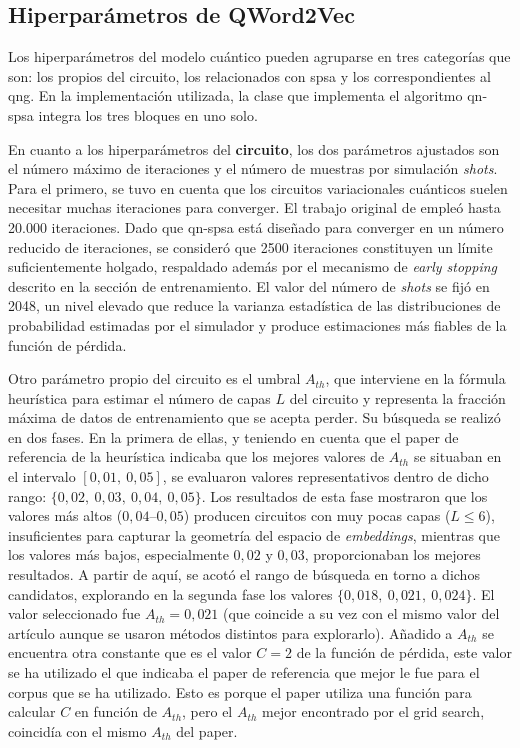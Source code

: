 \subsection{Hiperparámetros de QWord2Vec}

Los hiperparámetros del modelo cuántico pueden agruparse en tres categorías que son: los propios del circuito, los relacionados con \gls{spsa} y los correspondientes al \gls{qng}. En la implementación utilizada, la clase que implementa el algoritmo \gls{qn-spsa} integra los tres bloques en uno solo.

En cuanto a los hiperparámetros del \textbf{circuito}, los dos parámetros ajustados son el número máximo de iteraciones y el número de muestras por simulación \textit{shots}. Para el primero, se tuvo en cuenta que los circuitos variacionales cuánticos suelen necesitar muchas iteraciones para converger. El trabajo original de \cite{ohno_qword2vec_2025} empleó hasta 20.000 iteraciones. Dado que \gls{qn-spsa} está diseñado para converger en un número reducido de iteraciones, se consideró que 2500 iteraciones constituyen un límite suficientemente holgado, respaldado además por el mecanismo de \textit{early stopping} descrito en la sección de entrenamiento. El valor del número de \textit{shots} se fijó en 2048, un nivel elevado que reduce la varianza estadística de las distribuciones de probabilidad estimadas por el simulador y produce estimaciones más fiables de la función de pérdida.

Otro parámetro propio del circuito es el umbral $A_{th}$, que interviene en la fórmula heurística para estimar el número de capas $L$ del circuito y representa la fracción máxima de datos de entrenamiento que se acepta perder. Su búsqueda se realizó en dos fases. En la primera de ellas, y teniendo en cuenta que el paper de referencia de la heurística indicaba que los mejores valores de $A_{th}$ se situaban en el intervalo $[0{,}01,\ 0{,}05]$, se evaluaron valores representativos dentro de dicho rango: $\{0{,}02,\ 0{,}03,\ 0{,}04,\ 0{,}05\}$. Los resultados de esta fase mostraron que los valores más altos ($0{,}04$--$0{,}05$) producen circuitos con muy pocas capas ($L \leq 6$), insuficientes para capturar la geometría del espacio de \textit{embeddings}, mientras que los valores más bajos, especialmente $0{,}02$ y $0{,}03$, proporcionaban los mejores resultados. A partir de aquí, se acotó el rango de búsqueda en torno a dichos candidatos, explorando en la segunda fase los valores $\{0{,}018,\ 0{,}021,\ 0{,}024\}$. El valor seleccionado fue $A_{th} = 0{,}021$ (que coincide a su vez con el mismo valor del artículo \cite{ohno_qword2vec_2025} aunque se usaron métodos distintos para explorarlo). Añadido a $A_{th}$ se encuentra otra constante que es el valor $C = 2$ de la función de pérdida, este valor se ha utilizado el que indicaba el paper de referencia que mejor le fue para el corpus que se ha utilizado. Esto es porque el paper utiliza una función para calcular $C$ en función de $A_{th}$, pero el $A_{th}$ mejor encontrado por el grid search, coincidía con el mismo $A_{th}$ del paper.

